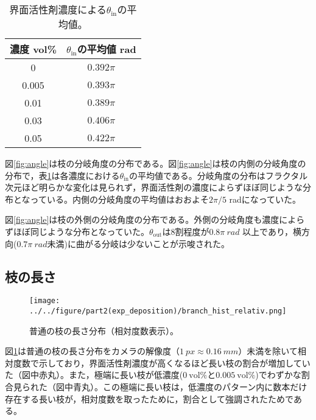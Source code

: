 \documentclass[autodetect-engine,dvi=dvipdfmx,a4paper,ja=standard,oneside,openany,11pt]{bxjsbook}
\begin{document}
\begin{table}
  \centering
  \caption{界面活性剤濃度による$\theta_{\mathrm{in}}$の平均値。}
  \begin{tabular}{|c|c|}
    \hline
    濃度 vol\% & $\theta_{\mathrm{in}}$の平均値 rad \\
    \hline\hline
    0        & $0.392\pi$                     \\ \hline
    0.005    & $0.393\pi$                     \\ \hline
    0.01     & $0.389\pi$                     \\ \hline
    0.03     & $0.406\pi$                     \\ \hline
    0.05     & $0.422\pi$                     \\
    \hline
  \end{tabular}
  \label{tab:angle_average}
\end{table}

図\ref{fig:angle}は枝の分岐角度の分布である。図\ref{fig:angle}は枝の内側の分岐角度の分布で，表\ref{tab:angle_average}は各濃度における$\theta_{\mathrm{in}}$の平均値である。分岐角度の分布はフラクタル次元ほど明らかな変化は見られず，界面活性剤の濃度によらずほぼ同じような分布となっている。内側の分岐角度の平均値はおおよそ$2\pi/5$ radになっていた。

図\ref{fig:angle}は枝の外側の分岐角度の分布である。外側の分岐角度も濃度によらずほぼ同じような分布となっていた。$\theta_{\mathrm{out}}$は8割程度が$0.8\pi \ \si{rad}$ 以上であり，横方向($0.7\pi \ \si{rad}$未満)に曲がる分岐は少ないことが示唆された。
\subsection{枝の長さ}

\begin{figure}[htbp]
  \centering
  \texttt{[image: ../../figure/part2(exp\_deposition)/branch\_hist\_relativ.png]}
  \caption{普通の枝の長さ分布（相対度数表示）。}
  \label{fig:branch_length}
\end{figure}

図\ref{fig:branch_length}は普通の枝の長さ分布をカメラの解像度（$\SI{1}{px}\approx \SI{0.16}{mm}$）未満を除いて相対度数で示しており，界面活性剤濃度が高くなるほど長い枝の割合が増加していた（図中赤丸）。また，極端に長い枝が低濃度($\SI{0}{\mathrm{vol}\%}$と$\SI{0.005}{\mathrm{vol}\%}$)でわずかな割合見られた（図中青丸）。この極端に長い枝は，低濃度のパターン内に数本だけ存在する長い枝が，相対度数を取ったために，割合として強調されたためである。
\end{document}
